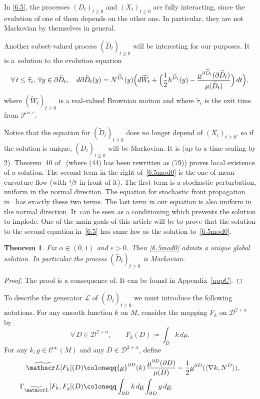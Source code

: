 \documentclass[JEP,XML,SOM,Unicode,NoFloatCountersInSection,published]{cedram}
\let\epsilon\varepsilon
\theoremstyle{plain}
\newtheorem{thm}{Theorem}[section]
\theoremstyle{definition}
\newcommand{\SL}{{\mathscr L}}
\newcommand\df{\coloneqq}
\newcommand{\bq}{\begin{equation*}}
\newcommand{\eq}{\end{equation*}}
\newcommand{\fo}{\forall\,}
\newcommand{\usm}{{\underline{\smash{\mu}}}}
\let\f\frac
\let\a\alpha
\let\e\varepsilon
\let\n\nabla
\let\pa\partial
\let\wi\widetilde
\let\iy\infty
\newcommand{\cC}{\mathcal{C}}
\newcommand{\cD}{\mathcal{D}}
\newcommand{\cF}{\mathcal{F}}
\begin{document}
\par
In \eqref{6.5}, the processes $(D_t)_{t\geq 0}$
and $(X_t)_{t\geq 0}$ are fully interacting, since the evolution of one of them depends on the other one.
In particular, they are not Markovian by themselves in general.
\par
Another subset-valued process $(\wi D_t)_{t\geq 0}$ will be interesting for our purposes. It is a~solution to the evolution equation
\begin{equation}\label{6.5mod0}
\fo t\leq \wi\tau_\epsilon,\, \forall y\in \partial \wi D_t,\quad
d\partial \wi D_t(y)=N^{\wi D_t}(y)\Bigl(d\wi W_t+\Bigl(\f12 h^{\wi D_t}(y)-\f{\usm^{\partial\wi D_t}(\partial\wi D_t)}{\mu(\wi D_t)}\Bigr)\,dt\Bigr),
\end{equation}
where $(\wi W_t)_{t\geq 0}$ is a real-valued Brownian motion and where $\wi\tau_\epsilon$ is the exit time from $\cF^{\alpha,\epsilon}$.
\par
Notice that the equation for $(\wi D_t)_{t\geq 0}$ does no longer depend of $(X_t)_{t\geq 0}$, so if the solution is unique, $(\wi D_t)_{t\geq 0}$ will be Markovian.
It is \cite[Eq.\,(44)]{zbMATH07470497} (up to a time scaling by 2). Theorem~40 of~\cite{zbMATH07470497} (where (44) has been rewritten as (79)) proves local existence of a solution. The second term in the right of~\eqref{6.5mod0} is the one of mean curvature flow (with $\sfrac12$ in front of it). The first term is a stochastic perturbation, uniform in the normal direction. The equation for stochastic front propagation in~\cite{GGLS:22} has exactly these two terms. The last term in our equation is also uniform in the normal direction. It~can be seen as a conditioning which prevents the solution to implode. One of the main goals of this article will be to prove that the solution to the second equation in~\eqref{6.5} has same law as the solution to~\eqref{6.5mod0}.
\begin{thm}\label{6.5mod0hyp}
Fix $\a\in (0,1)$ and $\e>0$. Then \eqref{6.5mod0} admits a unique
global solution. In particular the process $(\wi D_t)_{t\geq 0}$ is Markovian.
\end{thm}
\begin{proof}
The proof is a consequence of\cite[Th.\,22]{zbMATH07470497}. It can be found in Appendix~\ref{appC}.
\end{proof}
\par
To describe the generator $\wi\SL$ of $(\wi D_t)_{t\geq 0}$ we must introduce the following notations.
For any smooth function $k$ on $M$, consider the mapping $F_k$ on $\cD^{2+\alpha}$ by
\bq
\fo D\in \cD^{2+\alpha},\qquad F_k(D)\df \int_D k\, d\mu.
\eq
For any $k,g\in \cC^\iy(M)$ and any $D\in \cD^{2+\alpha}$, define
\begin{align}
\label{6.7}
\wi \SL[F_k](D)&\df \usm^{\partial D}(k)\,\f{\usm^{\partial D}(\partial D)}{\mu(D)}-\f12 \usm^{\partial D}(\langle \n k, N^D\rangle ),\\
\label{6.7b}\Gamma_{\wi\SL}[F_k, F_g](D)&\df \int_{\pa D} k\, d\usm\int_{\pa D} g\, d\usm.
\end{align}
\end{document}
